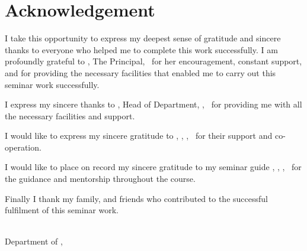 \chapter*{Acknowledgement}

I take this opportunity to express my deepest sense of gratitude and sincere
thanks to everyone who helped me to complete this work successfully. I am
profoundly grateful to \principalname, The Principal, \college\ for her
encouragement, constant support, and for providing the necessary facilities
that enabled me to carry out this seminar work successfully.

I express my sincere thanks to \hodname, Head of Department, \department,
\college\ for providing me with all the necessary facilities and support.

I would like to express my sincere gratitude to \coordinatorname,
\coordinatordesignation, \department, \college\ for their support and
co-operation.

I would like to place on record my sincere gratitude to my seminar guide
\guidename, \guidedesignation, \department, \college\ for the guidance and
mentorship throughout the course.

Finally I thank my family, and friends who contributed to the successful
fulfilment of this seminar work.

\vspace{0.8cm}
\noindent\textbf{\MakeUppercase{\studentname}}\\
Department of \deptshort, \college
